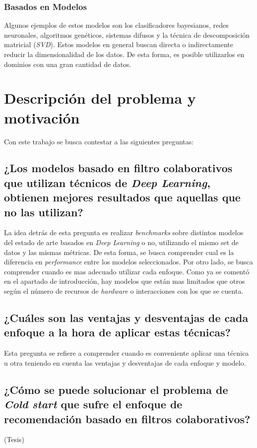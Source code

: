 \documentclass[11pt,a4paper,twoside]{thesis}
\begin{document}
\subsubsection{Basados en Modelos}

Algunos ejemplos de estos modelos son los clasificadores bayesianos, redes
neuronales, algoritmos genéticos, sistemas difusos y la técnica de
descomposición matricial (\textit{SVD}). Estos modelos en general buscan
directa o indirectamente reducir la dimensionalidad de los datos. De esta
forma, es posible utilizarlos en dominios con una gran cantidad de datos.

\clearpage
\section{Descripción del problema y motivación}

Con este trabajo se busca contestar a las siguientes preguntas:

\subsection{¿Los modelos basado en filtro colaborativos que utilizan técnicos de \textit{Deep Learning}, obtienen mejores resultados que aquellas que no las utilizan?}

La idea detrás de esta pregunta es realizar \textit{benchmarks} sobre distintos
modelos del estado de arte basados en \textit{Deep Learning} o no, utilizando
el mismo set de datos y las mismas métricas. De esta forma, se busca comprender
cual es la diferencia en \textit{performance} entre los modelos seleccionados.
Por otro lado, se busca comprender cuando es mas adecuado utilizar cada
enfoque. Como ya se comentó en el apartado de introducción, hay modelos que
están mas limitados que otros según el número de recursos de \textit{hardware}
o interacciones con los que se cuenta.

\subsection{¿Cuáles son las ventajas y desventajas de cada enfoque a la hora de aplicar estas técnicas?}

Esta pregunta se refiere a comprender cuando es conveniente aplicar una técnica
u otra teniendo en cuenta las ventajas y desventajas de cada enfoque y modelo.

\subsection{¿Cómo se puede solucionar el problema de \textit{Cold start} que sufre el enfoque de recomendación basado en filtros colaborativos?} (Tesis)
\end{document}
